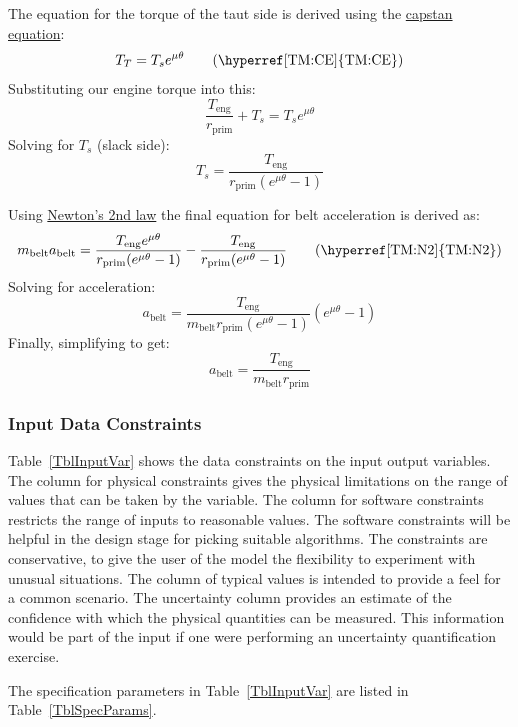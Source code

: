 \documentclass[12pt]{article}
\begin{document}
The equation for the torque of the taut side is derived using the \hyperref[TM:CE]{capstan equation}:
\[T_T = T_s e^{\mu \theta} \tag*{\text{(\hyperref[TM:CE]{TM:CE})}}\]
Substituting our engine torque into this: \\
\[\frac{T_{\text{eng}}}{r_{\text{prim}}} + T_s = T_s e^{\mu \theta}\]
Solving for \(T_s\) (slack side): \\
\[T_s = \frac{T_{\text{eng}}}{r_{\text{prim}} (e^{\mu \theta} - 1)}\]
{\newline}

Using \hyperref[TM:N2]{Newton's 2nd law} the final equation for belt acceleration is derived as: \\
\[m_\text{belt} a_{\text{belt}} = \frac{T_{\text{eng}} e^{\mu \theta}}{r_{\text{prim}} (e^{\mu \theta} - 1)} - \frac{T_{\text{eng}}}{r_{\text{prim}} (e^{\mu \theta} - 1)}  \tag*{\text{(\hyperref[TM:N2]{TM:N2})}}\]
Solving for acceleration: \\
\[a_{\text{belt}} = \frac{T_{\text{eng}}}{m_\text{belt} r_{\text{prim}} (e^{\mu \theta} - 1)} (e^{\mu \theta} - 1)\]
Finally, simplifying to get: \\
\[a_{\text{belt}} = \frac{T_{\text{eng}}}{m_\text{belt} r_{\text{prim}}}\]



\subsubsection{Input Data Constraints} \label{sec_DataConstraints}    

Table~\ref{TblInputVar} shows the data constraints on the input output
variables.  The column for physical constraints gives the physical limitations
on the range of values that can be taken by the variable.  The column for
software constraints restricts the range of inputs to reasonable values.  The
software constraints will be helpful in the design stage for picking suitable
algorithms.  The constraints are conservative, to give the user of the model the
flexibility to experiment with unusual situations.  The column of typical values
is intended to provide a feel for a common scenario.  The uncertainty column
provides an estimate of the confidence with which the physical quantities can be
measured.  This information would be part of the input if one were performing an
uncertainty quantification exercise.

The specification parameters in Table~\ref{TblInputVar} are listed in
Table~\ref{TblSpecParams}.
\end{document}
